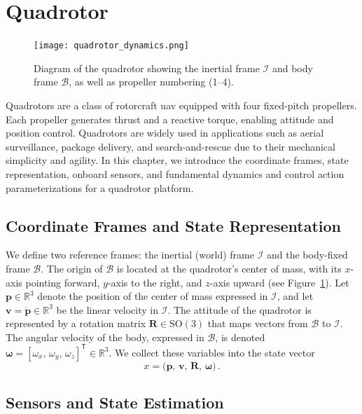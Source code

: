 \section{Quadrotor}
\label{sec:quadrotor_control}

\begin{figure}[t]
  \centering
  \texttt{[image: quadrotor\_dynamics.png]}
  \caption{Diagram of the quadrotor showing the inertial frame \(\mathcal{I}\) and body frame \(\mathcal{B}\), as well as propeller numbering (1–4).}
  \label{fig:quadrotor_frames}
\end{figure}

Quadrotors are a class of rotorcraft \gls{uav} equipped with four fixed-pitch propellers. Each propeller generates thrust and a reactive torque, enabling attitude and position control. Quadrotors are widely used in applications such as aerial surveillance, package delivery, and search-and-rescue due to their mechanical simplicity and agility. In this chapter, we introduce the coordinate frames, state representation, onboard sensors, and fundamental dynamics and control action parameterizations for a quadrotor platform.

\subsection{Coordinate Frames and State Representation}
\label{sec:quadrotor_state}

We define two reference frames: the inertial (world) frame \(\mathcal{I}\) and the body-fixed frame \(\mathcal{B}\). The origin of \(\mathcal{B}\) is located at the quadrotor's center of mass, with its \(x\)-axis pointing forward, \(y\)-axis to the right, and \(z\)-axis upward (see Figure~\ref{fig:quadrotor_frames}). Let \(\mathbf{p}\in \mathbb{R}^{3}\) denote the position of the center of mass expressed in \(\mathcal{I}\), and let \(\mathbf{v} = \dot{\mathbf{p}}\in \mathbb{R}^{3}\) be the linear velocity in \(\mathcal{I}\). The attitude of the quadrotor is represented by a rotation matrix \(\mathbf{R} \in \mathrm{SO}(3)\) that maps vectors from \(\mathcal{B}\) to \(\mathcal{I}\). The angular velocity of the body, expressed in \(\mathcal{B}\), is denoted \(\boldsymbol{\omega} = [\omega_{x},\,\omega_{y},\,\omega_{z}]^{\mathsf{T}}\in \mathbb{R}^{3}\). We collect these variables into the state vector
\[
x = \bigl(\mathbf{p},\,\mathbf{v},\,\mathbf{R},\,\boldsymbol{\omega}\bigr)\,.
\]

\subsection{Sensors and State Estimation}
\label{sec:quadrotor_estimation}

